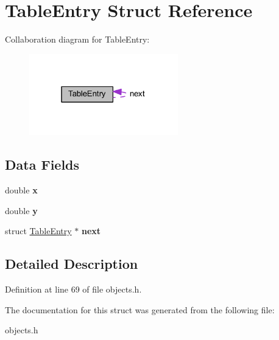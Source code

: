 \hypertarget{struct_table_entry}{}\section{Table\+Entry Struct Reference}
\label{struct_table_entry}


Collaboration diagram for Table\+Entry\+:
\nopagebreak
\begin{figure}[H]
\begin{center}
\leavevmode
\includegraphics[width=183pt]{d2/d3f/struct_table_entry__coll__graph}
\end{center}
\end{figure}
\subsection*{Data Fields}
\begin{DoxyCompactItemize}
\item 
\mbox{\label{struct_table_entry_af88b946fb90d5f08b5fb740c70e98c10}} 
double {\bfseries x}
\item 
\mbox{\label{struct_table_entry_ab927965981178aa1fba979a37168db2a}} 
double {\bfseries y}
\item 
\mbox{\label{struct_table_entry_a1ec8e745c1f8d86e2b72d5272882159d}} 
struct \hyperlink{struct_table_entry}{Table\+Entry} $\ast$ {\bfseries next}
\end{DoxyCompactItemize}


\subsection{Detailed Description}


Definition at line 69 of file objects.\+h.



The documentation for this struct was generated from the following file\+:\begin{DoxyCompactItemize}
\item 
objects.\+h\end{DoxyCompactItemize}
